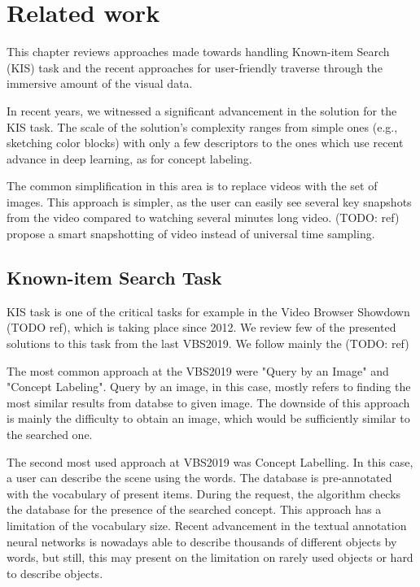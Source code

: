 \chapter{Related work}


This chapter reviews approaches made towards handling Known-item Search (KIS) task and the recent approaches for user-friendly traverse through the immersive amount of the visual data.

In recent years, we witnessed a significant advancement in the solution for the KIS task. The scale of the solution's complexity ranges from simple ones (e.g., sketching color blocks) with only a few descriptors to the ones which use recent advance in deep learning, as for concept labeling. 

The common simplification in this area is to replace videos with the set of images. This approach is simpler, as the user can easily see several key snapshots from the video compared to watching several minutes long video. (TODO: ref) propose a smart snapshotting of video instead of universal time sampling.

\section*{Known-item Search Task}
KIS task is one of the critical tasks for example in the Video Browser Showdown (TODO ref), which is taking place since 2012. We review few of the presented solutions to this task from the last VBS2019. We follow mainly the (TODO: ref)

The most common approach at the VBS2019 were "Query by an Image" and "Concept Labeling". Query by an image, in this case, mostly refers to finding the most similar results from databse to given image. The downside of this approach is mainly the difficulty to obtain an image, which would be sufficiently similar to the searched one.

The second most used approach at VBS2019 was Concept Labelling. In this case, a user can describe the scene using the words. The database is pre-annotated with the vocabulary of present items. During the request, the algorithm checks the database for the presence of the searched concept. This approach has a limitation of the vocabulary size. Recent advancement in the textual annotation neural networks is nowadays able to describe thousands of different objects by words, but still, this may present on the limitation on rarely used objects or hard to describe objects.

